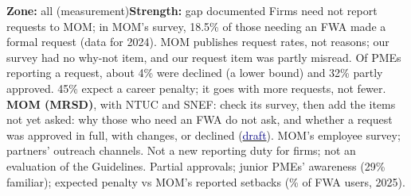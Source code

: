   {\textbf{Zone:} all (measurement)\quad\textbf{Strength:} gap documented}
  {%
   Firms need not report requests to MOM; in MOM's survey, 18.5\% of those needing an FWA made a formal request (data for 2024). MOM publishes request rates, not reasons; our survey had no why-not item, and our request item was partly misread. Of PMEs reporting a request, about 4\% were declined (a lower bound) and 32\% partly approved. 45\% expect a career penalty; it goes with more requests, not fewer.}
  {%
   \textbf{MOM (MRSD)}, with NTUC and SNEF: check its survey, then add the items not yet asked: why those who need an FWA do not ask, and whether a request was approved in full, with changes, or declined (\hyperlink{B-optD-items}{\textcolor{Navy}{draft}}).}
  {MOM's employee survey; partners' outreach channels.}
  {Not a new reporting duty for firms; not an evaluation of the Guidelines.}
  {%
   Partial approvals; junior PMEs' awareness (29\% familiar); expected penalty vs MOM's reported setbacks (\% of FWA users, 2025).}
  {%
   }

